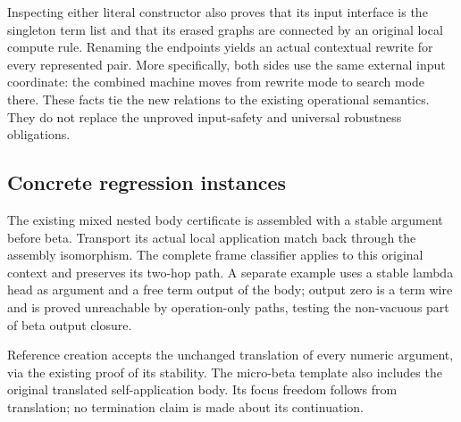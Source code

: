 Inspecting either literal constructor also proves that its input interface
is the singleton term list and that its erased graphs are connected by an
original local compute rule. Renaming the endpoints yields an actual
contextual rewrite for every represented pair. More specifically, both
sides use the same external input coordinate: the combined machine moves
from rewrite mode to search mode there. These facts tie the new relations
to the existing operational semantics. They do not replace the unproved
input-safety and universal robustness obligations.


\subsection{Concrete regression instances}
The existing mixed nested body certificate is assembled with a stable
argument before beta. Transport its actual local application match back
through the assembly isomorphism. The complete frame classifier applies to
this original context and preserves its two-hop path. A separate example
uses a stable lambda head as argument and a free term output of the body;
output zero is a term wire and is proved unreachable by operation-only
paths, testing the non-vacuous part of beta output closure.


Reference creation accepts the unchanged translation of every numeric
argument, via the existing proof of its stability. The micro-beta template
also includes the original translated self-application body. Its focus
freedom follows from translation; no termination claim is made about its
continuation.


